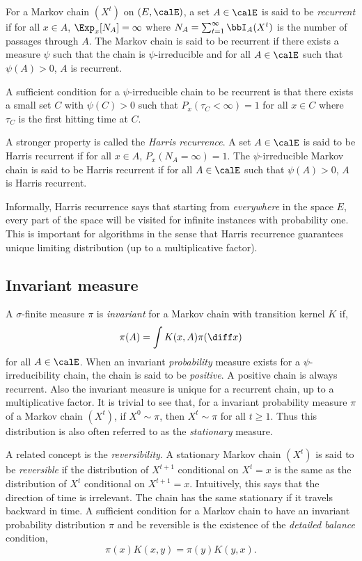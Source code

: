 For a Markov chain $(X^t)$ on $(E,\calE)$, a set $A\in\calE$ is said to be
\emph{recurrent} if for all $x\in A$, $\Exp_x[N_A] = \infty$ where $N_A =
\sum_{t=1}^{\infty}\bbI_A(X^t)$ is the number of passages through $A$. The
Markov chain is said to be recurrent if there exists a measure $\psi$ such
that the chain is $\psi$-irreducible and for all $A\in\calE$ such that
$\psi(A)>0$, $A$ is recurrent.

A sufficient condition for a $\psi$-irreducible chain to be recurrent is that
there exists a small set $C$ with $\psi(C)>0$ such that $P_x(\tau_C<\infty) =
1$ for all $x\in C$ where $\tau_C$ is the first hitting time at $C$.

A stronger property is called the \emph{Harris recurrence}. A set $A\in\calE$
is said to be Harris recurrent if for all $x\in A$, $P_x(N_A = \infty) = 1$.
The $\psi$-irreducible Markov chain is said to be Harris recurrent if for all
$A\in\calE$ such that $\psi(A)>0$, $A$ is Harris recurrent.

Informally, Harris recurrence says that starting from \emph{everywhere} in
the space $E$, every part of the space will be visited for infinite instances
with probability one. This is important for \mcmc algorithms in the sense
that Harris recurrence guarantees unique limiting distribution (up to a
multiplicative factor).

\subsection{Invariant measure}
\label{sub: Appdendix Invariant measure}

A $\sigma$-finite measure $\pi$ is \emph{invariant} for a Markov chain with
transition kernel $K$ if,
\begin{equation}
  \pi(A) = \int K(x,A)\pi(\diff x)
\end{equation}
for all $A\in\calE$. When an invariant \emph{probability} measure exists for
a $\psi$-irreducibility chain, the chain is said to be \emph{positive}. A
positive chain is always recurrent. Also the invariant measure is unique for
a recurrent chain, up to a multiplicative factor. It is trivial to see that,
for a invariant probability measure $\pi$ of a Markov chain $(X^t)$, if
$X^0\sim\pi$, then $X^t\sim\pi$ for all $t\ge1$. Thus this distribution is
also often referred to as the \emph{stationary} measure.

A related concept is the \emph{reversibility}. A stationary Markov chain
$(X^t)$ is said to be \emph{reversible} if the distribution of $X^{t+1}$
conditional on $X^t = x$ is the same as the distribution of $X^t$ conditional
on $X^{t+1} = x$. Intuitively, this says that the direction of time is
irrelevant. The chain has the same stationary if it travels backward in time.
A sufficient condition for a Markov chain to have an invariant probability
distribution $\pi$ and be reversible is the existence of the \emph{detailed
balance} condition,  
\begin{equation}
  \pi(x)K(x,y) = \pi(y)K(y,x).
\end{equation}

